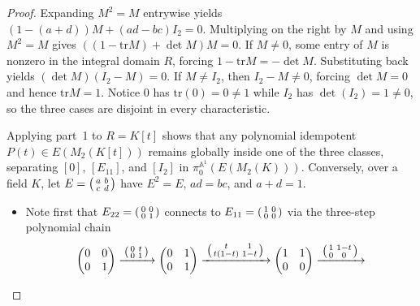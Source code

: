 \documentclass[11pt,a4paper]{article}
\theoremstyle{definition}
\newcommand{\tr}{\mathrm{tr}}
\newenvironment{psmallmatrix}{\left(\begin{smallmatrix}}{\end{smallmatrix}\right)}
\begin{document}
\begin{proof}
Expanding $M^2 = M$ entrywise yields $(1-(a+d))M + (ad-bc)I_2 = 0$. Multiplying on the right
by $M$ and using $M^2=M$ gives $((1-\tr M)+\det M)M = 0$. If $M\ne 0$, some entry of $M$ is
nonzero in the integral domain $R$, forcing $1-\tr M = -\det M$. Substituting back yields
$(\det M)(I_2 - M) = 0$. If $M\ne I_2$, then $I_2-M\ne 0$, forcing $\det M = 0$ and hence
$\tr M = 1$. Notice $0$ has $\tr(0)=0\ne 1$ while $I_2$ has $\det(I_2)=1\ne 0$, so the three
cases are disjoint in every characteristic.

Applying part~1 to $R = K[t]$ shows that any polynomial idempotent $P(t)\in E(M_2(K[t]))$
remains globally inside one of the three classes, separating $[0]$, $[E_{11}]$, and $[I_2]$
in $\pi_0^{\mathbb{A}^1}(E(M_2(K)))$. Conversely, over a field $K$, let $E=\begin{psmallmatrix}a&b\\ c&d\end{psmallmatrix}$
have $E^2=E$, $ad=bc$, and $a+d=1$.
\begin{itemize}
  \setlength{\itemsep}{1pt}
  \item Note first that $E_{22}=\begin{psmallmatrix}0&0\\ 0&1\end{psmallmatrix}$ connects to
    $E_{11}=\begin{psmallmatrix}1&0\\ 0&0\end{psmallmatrix}$ via the three-step polynomial chain
    \[
      \begin{pmatrix}0&0\\ 0&1\end{pmatrix}
      \xrightarrow{\;\begin{psmallmatrix}0&t\\ 0&1\end{psmallmatrix}\;}
      \begin{pmatrix}0&1\\ 0&1\end{pmatrix}
      \xrightarrow{\;\begin{psmallmatrix}t&1\\ t(1-t)&1-t\end{psmallmatrix}\;}
      \begin{pmatrix}1&1\\ 0&0\end{pmatrix}
      \xrightarrow{\;\begin{psmallmatrix}1&1-t\\ 0&0\end{psmallmatrix}\;}
\]
\end{itemize}
\end{proof}
\end{document}
